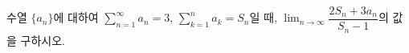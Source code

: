 수열 $\{a_n\}$에 대하여 $\displaystyle\sum_{n=1}^{\infty} a_n=3$, $\displaystyle\sum_{k=1}^{n} a_k=S_n$일 때, $\displaystyle\lim_{n\to\infty}\dfrac{2S_n+3a_n}{S_n-1}$의 값을 구하시오.
